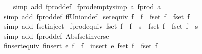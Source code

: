 \begin{isabellebody}
%
\isadelimproof
\ \ %
\endisadelimproof
%
\isatagproof
{}\isamarkupfalse%
\ {\isacharparenleft}simp\ add{\isacharcolon}\ fprod{\isacharunderscore}def{\isacharparenright}%
\endisatagproof
{\isafoldproof}%
%
\isadelimproof
\isanewline
%
\endisadelimproof
\isanewline
{}\isamarkupfalse%
\ fprod{\isacharunderscore}empty{\isacharunderscore}{}{\isacharbrackleft}simp{\isacharbrackright}{\isacharcolon}\ {\isachardoublequoteopen}{\isasymforall}a{\isachardot}\ fprod\ a\ {\isacharbraceleft}{\isacharbar}{\isacharbar}{\isacharbraceright}\ {\isacharequal}\ {\isacharbraceleft}{\isacharbar}{\isacharbar}{\isacharbraceright}{\isachardoublequoteclose}\isanewline
%
\isadelimproof
\ \ %
\endisadelimproof
%
\isatagproof
{}\isamarkupfalse%
\ {\isacharparenleft}simp\ add{\isacharcolon}\ fprod{\isacharunderscore}def\ ffUnion{\isacharunderscore}def{\isacharparenright}%
\endisatagproof
{\isafoldproof}%
%
\isadelimproof
\isanewline
%
\endisadelimproof
\isanewline
{}\isamarkupfalse%
\ set{\isacharunderscore}equiv{\isacharcolon}\ {\isachardoublequoteopen}{\isacharparenleft}f{}\ {\isacharequal}\ f{}{\isacharparenright}\ {\isacharequal}\ {\isacharparenleft}fset\ f{}\ {\isacharequal}\ fset\ f{}{\isacharparenright}{\isachardoublequoteclose}\isanewline
%
\isadelimproof
\ \ %
\endisadelimproof
%
\isatagproof
{}\isamarkupfalse%
\ {\isacharparenleft}simp\ add{\isacharcolon}\ fset{\isacharunderscore}inject{\isacharparenright}%
\endisatagproof
{\isafoldproof}%
%
\isadelimproof
\isanewline
%
\endisadelimproof
\isanewline
{}\isamarkupfalse%
\ fprod{\isacharunderscore}equiv{\isacharcolon}\ {\isachardoublequoteopen}{\isacharparenleft}fset\ {\isacharparenleft}f\ {\isacharbar}{\isasymtimes}{\isacharbar}\ f{\isacharprime}{\isacharparenright}\ {\isacharequal}\ s{\isacharparenright}\ {\isacharequal}\ {\isacharparenleft}{\isacharparenleft}{\isacharparenleft}fset\ f{\isacharparenright}\ {\isasymtimes}\ {\isacharparenleft}fset\ f{\isacharprime}{\isacharparenright}{\isacharparenright}\ {\isacharequal}\ s{\isacharparenright}{\isachardoublequoteclose}\isanewline
%
\isadelimproof
\ \ %
\endisadelimproof
%
\isatagproof
{}\isamarkupfalse%
\ {\isacharparenleft}simp\ add{\isacharcolon}\ fprod{\isacharunderscore}def\ Abs{\isacharunderscore}fset{\isacharunderscore}inverse{\isacharparenright}%
\endisatagproof
{\isafoldproof}%
%
\isadelimproof
\isanewline
%
\endisadelimproof
\isanewline
{}\isamarkupfalse%
\ finsert{\isacharunderscore}equiv{\isacharcolon}\ {\isachardoublequoteopen}{\isacharparenleft}finsert\ e\ f\ {\isacharequal}\ f{\isacharprime}{\isacharparenright}\ {\isacharequal}\ {\isacharparenleft}insert\ e\ {\isacharparenleft}fset\ f{\isacharparenright}\ {\isacharequal}\ {\isacharparenleft}fset\ f{\isacharprime}{\isacharparenright}{\isacharparenright}{\isachardoublequoteclose}\isanewline

\end{isabellebody}
